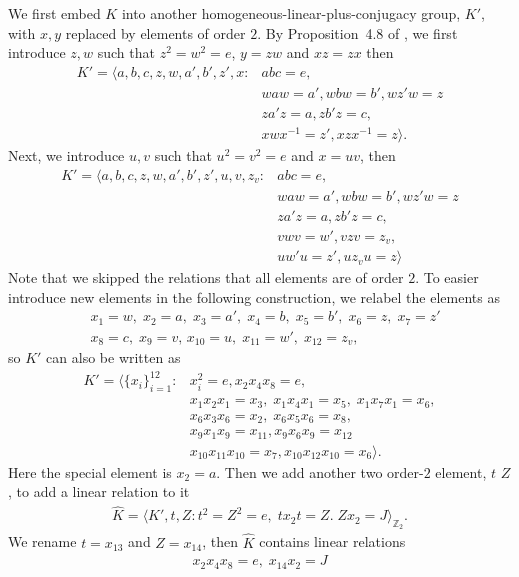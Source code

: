 \documentclass[11pt,letterpaper]{article}
\newcommand{\1}{\mathbb{1}}
\theoremstyle{definition}
\begin{document}
We first embed $K$ into another homogeneous-linear-plus-conjugacy group, $K'$, 
with $x,y$ replaced by elements of order $2$. By Proposition~4.8 of \cite{slofstra2017},
we first introduce $z,w$ such that $z^2=w^2=e$, $y=zw$ and $xz=zx$ then
\begin{align}
	K' = \langle a,b,c,z,w,a',b',z',x: &abc = e,\\
	&waw=a', wbw=b', wz'w=z \\
	&za'z=a,zb'z=c,\\
	&xwx^{-1}=z', xzx^{-1} =z \rangle.
\end{align}
Next, we introduce $u,v$ such that $u^2=v^2=e$ and $x=uv$, then
\begin{align*}
	K' = \langle a,b,c,z,w,a',b',z',u,v,z_v: &abc = e, \\
	&waw=a', wbw=b', wz'w=z \\
	&za'z=a,zb'z=c,\\
	&vwv=w', vzv=z_v,\\
	&uw'u=z', uz_vu = z\rangle
\end{align*}
Note that we skipped the relations that all elements are of order $2$.
To easier introduce new elements in the following construction, we relabel the elements as
\begin{align*}
	&x_1 = w,\; x_2 = a,\; x_3 = a',\; x_4 =b, \;x_5 = b', \;x_6 = z, \;x_7 = z'\\
	&x_8 = c,\;x_9=v,\,x_{10} =u,\;x_{11} = w',\;x_{12} = z_v,
\end{align*}
so $K'$ can also be written as
\begin{equation}
\begin{split}
	K'=\langle \{x_i\}_{i=1}^{12}: &x_i^2 = e, x_2x_4x_8 = e,\\
	&x_1x_2x_1 =x_3, \;x_1x_4x_1 =x_5,\; x_1x_7x_1 =x_6,\\
	&x_6x_3x_6 =x_2, \;x_6x_5x_6 =x_8,\\
	&x_9x_1x_9 = x_{11},x_9x_6x_9 = x_{12}\\
	&x_{10}x_{11}x_{10} = x_7, x_{10}x_{12}x_{10} = x_6\rangle.
\end{split}
\end{equation}
Here the special element is $x_2 = a$.
Then we add another two order-$2$ element, $t$ $Z$, to add a linear relation to it
\begin{align}
	\hat{K} = \langle K', t ,Z: t^2=Z^2 = e,\; tx_2t = Z.\; Zx_2 = J\rangle_{\mathbb{Z}_2}.
\end{align}
We rename $t = x_{13}$ and $Z = x_{14}$, then $\hat{K}$ contains linear relations
\begin{align*}
	x_2x_4x_8 = e,\; x_{14}x_{2} = J
\end{align*}
\end{document}
